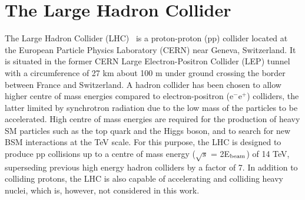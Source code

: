 
\section{The Large Hadron Collider}
\label{sec:LHC}


The Large Hadron Collider (LHC)~\cite{1748-0221-3-08-S08001} is a proton-proton (pp) collider located at the European Particle Physics Laboratory (CERN) near Geneva, Switzerland. It is situated in the former CERN Large Electron-Positron Collider (LEP) tunnel with a circumference of 27 km about 100 m under ground crossing the border between France and Switzerland. A hadron collider has been chosen to allow higher centre of mass energies compared to electron-positron (e$^-$e$^+$) colliders, the latter limited by synchrotron radiation due to the low mass of the particles to be accelerated. High centre of mass energies are required for the production of heavy SM particles such as the top quark and the Higgs boson, and to search for new BSM interactions at the TeV scale.
For this purpose, the LHC is designed to produce pp collisions up to a centre of mass energy ($\sqrt{s}$ = 2E$_{\rm beam}$) of 14 TeV, superseding previous high energy hadron colliders by a factor of 7. In addition to colliding protons, the LHC is also capable of accelerating and colliding heavy nuclei, which is, however, not considered in this work.

